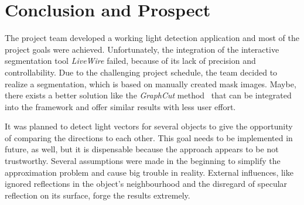 \section{Conclusion and Prospect} \label{sec:Conclusion}
The project team developed a working light detection application and most of the project goals were achieved. Unfortunately, the integration of the interactive segmentation tool \textit{LiveWire} failed, because of its lack of precision and controllability. Due to the challenging project schedule, the team decided to realize a segmentation, which is based on manually created mask images. Maybe, there exists a better solution like the \textit{GraphCut} method~\cite{Rother:2004} that can be integrated into the framework and offer similar results with less user effort.

It was planned to detect light vectors for several objects to give the opportunity of comparing the directions to each other. This goal needs to be implemented in future, as well, but it is dispensable because the approach appears to be not trustworthy. Several assumptions were made in the beginning to simplify the approximation problem and cause big trouble in reality. External influences, like ignored reflections in the object's neighbourhood and the disregard of specular reflection on its surface, forge the results extremely. 






















